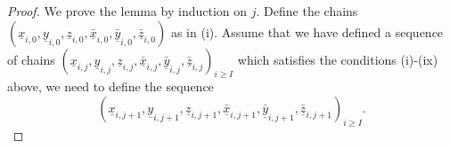 \documentclass[a4paper]{article}
\numberwithin{equation}{section}
\begin{document}
\begin{proof}
We prove the lemma by induction on $j$. Define the chains $(\underline{x}_{i,0},\underline{y}_{i,0},\underline{z}_{i,0},\bar{\underline{x}}_{i,0},\bar{\underline{y}}_{i,0},\bar{\underline{z}}_{i,0})$ as in (i). Assume that we have defined a sequence of chains $(\underline{x}_{i,j},\underline{y}_{i,j},\underline{z}_{i,j},\bar{\underline{x}}_{i,j},\bar{\underline{y}}_{i,j},\bar{\underline{z}}_{i,j})_{i\geq I}$ which satisfies the conditions (i)-(ix) above, we need to define the sequence 
\begin{equation}\label{eq:j+1}
(\underline{x}_{i,j+1},\underline{y}_{i,j+1},\underline{z}_{i,j+1},\bar{\underline{x}}_{i,j+1},\bar{\underline{y}}_{i,j+1},\bar{\underline{z}}_{i,j+1})_{i\geq I}.
\end{equation}


\end{proof}
\end{document}

